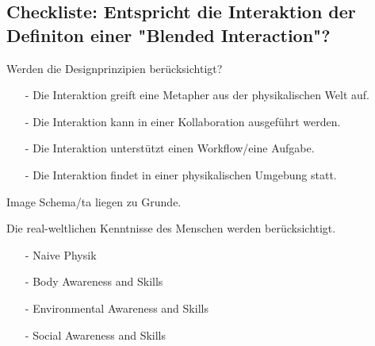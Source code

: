 \subsection*{Checkliste: Entspricht die Interaktion der Definiton einer "Blended Interaction"?}
\checkbox{\designprinciples} Werden die Designprinzipien berücksichtigt?
\begin{itemize}
\item[-] Die Interaktion greift eine Metapher aus der physikalischen Welt auf.
\item[-] Die Interaktion kann in einer Kollaboration ausgeführt werden.
\item[-] Die Interaktion unterstützt einen Workflow/eine Aufgabe.
\item[-] Die Interaktion findet in einer physikalischen Umgebung statt.
\end{itemize} 

\checkbox{\imageschemata} Image Schema/ta liegen zu Grunde.
\begin{itemize}
\end{itemize}

\checkbox{\realworld} Die real-weltlichen Kenntnisse des Menschen werden berücksichtigt.
\begin{itemize}
\item[-] \checkbox{\realworldNaivePhysic} Naive Physik
\item[-] \checkbox{\realworldBodyAwareness} Body Awareness and Skills
\item[-] \checkbox{\realworldEnvironmentAwareness} Environmental Awareness and Skills
\item[-] \checkbox{\realworldSocialAwareness} Social Awareness and Skills
\end{itemize}

